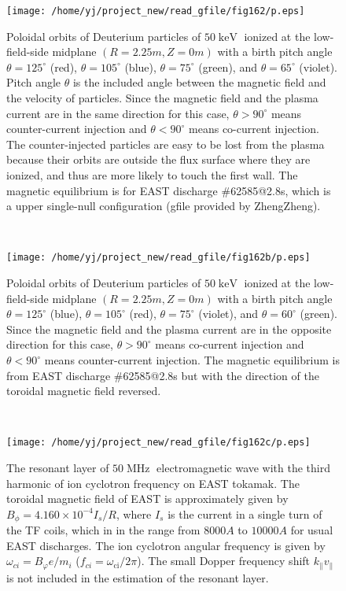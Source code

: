 \documentclass{article}
\newcommand{\tmop}[1]{\ensuremath{\operatorname{#1}}}
\begin{document}
\begin{figure}[h]
  \texttt{[image: /home/yj/project\_new/read\_gfile/fig162/p.eps]}
  \caption{\label{16-7-5-e1}Poloidal orbits of Deuterium particles of $50
  \tmop{keV}$ ionized at the low-field-side midplane $(R = 2.25 m, Z = 0 m)$
  with a birth pitch angle $\theta = 125^{\circ}$ (red), $\theta =
  105^{\circ}$ (blue), $\theta = 75^{\circ}$ (green), and $\theta =
  65^{\circ}$ (violet). Pitch angle $\theta$ is the included angle between the
  magnetic field and the velocity of particles. Since the magnetic field and
  the plasma current are in the same direction for this case, $\theta >
  90^{\circ}$ means counter-current injection and $\theta < 90^{\circ}$ means
  co-current injection. The counter-injected particles are easy to be lost
  from the plasma because their orbits are outside the flux surface where they
  are ionized, and thus are more likely to touch the first wall. The magnetic
  equilibrium is for EAST discharge \#62585@2.8s, which is a upper single-null
  configuration (gfile provided by ZhengZheng).}
\end{figure}

\

\begin{figure}[h]
  \texttt{[image: /home/yj/project\_new/read\_gfile/fig162b/p.eps]}
  \caption{\label{16-7-5-e2}Poloidal orbits of Deuterium particles of $50
  \tmop{keV}$ ionized at the low-field-side midplane $(R = 2.25 m, Z = 0 m)$
  with a birth pitch angle $\theta = 125^{\circ}$ (blue), $\theta =
  105^{\circ}$ (red), $\theta = 75^{\circ}$ (violet), and $\theta =
  60^{\circ}$ (green). Since the magnetic field and the plasma current are in
  the opposite direction for this case, $\theta > 90^{\circ}$ means co-current
  injection and $\theta < 90^{\circ}$ means counter-current injection. The
  magnetic equilibrium is from EAST discharge \#62585@2.8s but with the
  direction of the toroidal magnetic field reversed.}
\end{figure}

\

\begin{figure}[h]
  \texttt{[image: /home/yj/project\_new/read\_gfile/fig162c/p.eps]}
  \caption{The resonant layer of $50 \tmop{MHz}$ electromagnetic wave with the
  third harmonic of ion cyclotron frequency on EAST tokamak. The toroidal
  magnetic field of EAST is approximately given by $B_{\phi} = 4.160 \times
  10^{- 4} I_s / R$, where $I_s$ is the current in a single turn of the TF
  coils, which in in the range from $8000 A$ to $10000 A$ for usual EAST
  discharges. The ion cyclotron angular frequency is given by $\omega_{c i} =
  B_{\varphi} e / m_i$ ($f_{c i} = \omega_{\tmop{ci}} / 2 \pi$). The small
  Dopper frequency shift $k_{\parallel} v_{\parallel}$ is not included in the
  estimation of the resonant layer.}
\end{figure}
\end{document}
